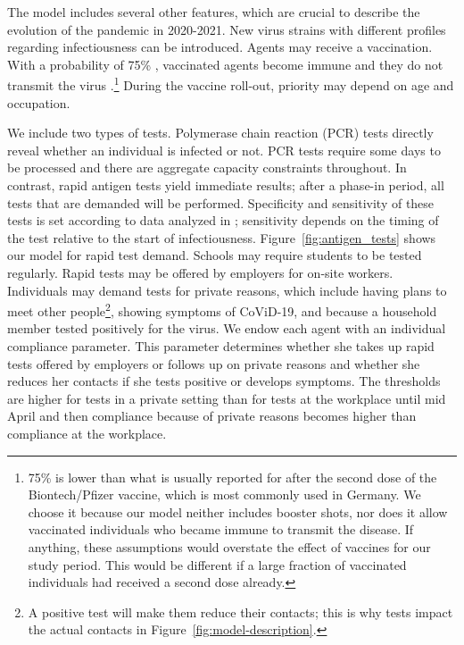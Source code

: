 The model includes several other features, which are crucial to describe the evolution
of the pandemic in 2020-2021. New virus strains with different profiles regarding
infectiousness can be introduced. Agents may receive a vaccination. With a probability
of 75\% \citep{Hunter2021}, vaccinated agents become immune and they do not transmit the
virus \citep{Petter2021, LevineTiefenbrun2021, Pritchard2021}.\footnote{75\% is
    lower than what is usually reported for after the second dose of the Biontech/Pfizer
    vaccine, which is most commonly used in Germany. We choose it because our model neither
    includes booster shots, nor does it allow vaccinated individuals who became immune to
    transmit the disease\citep{Petter2021, LevineTiefenbrun2021, Pritchard2021}. If
    anything, these assumptions would overstate the effect of vaccines for our study period.
    This would be different if a large fraction of vaccinated individuals had received a
    second dose already.} During the vaccine roll-out, priority may depend on age and
occupation.

We include two types of tests. Polymerase chain reaction (PCR) tests directly reveal
whether an individual is infected or not. PCR tests require some days to be processed and
there are aggregate capacity constraints throughout. In contrast, rapid antigen tests
yield immediate results; after a phase-in period, all tests that are demanded will be
performed. Specificity and sensitivity of these tests is set according to data analyzed
in \cite{Bruemmer2021, Smith2021}; sensitivity depends on the timing of the test relative
to the start of infectiousness. Figure~\ref{fig:antigen_tests} shows our model for rapid
test demand. Schools may require students to be tested regularly. Rapid tests may be
offered by employers for on-site workers. Individuals may demand tests for private
reasons, which include having plans to meet other people\footnote{A positive test will
make them reduce their contacts; this is why tests impact the actual contacts in
Figure~\ref{fig:model-description}.}, showing symptoms of CoViD-19, and because a
household member tested positively for the virus. We endow each agent with an individual
compliance parameter. This parameter determines whether she takes up rapid tests offered
by employers or follows up on private reasons and whether she reduces her contacts if she
tests positive or develops symptoms. The thresholds are higher for tests in a private
setting than for tests at the workplace until mid April and then compliance because of
private reasons becomes higher than compliance at the workplace.

